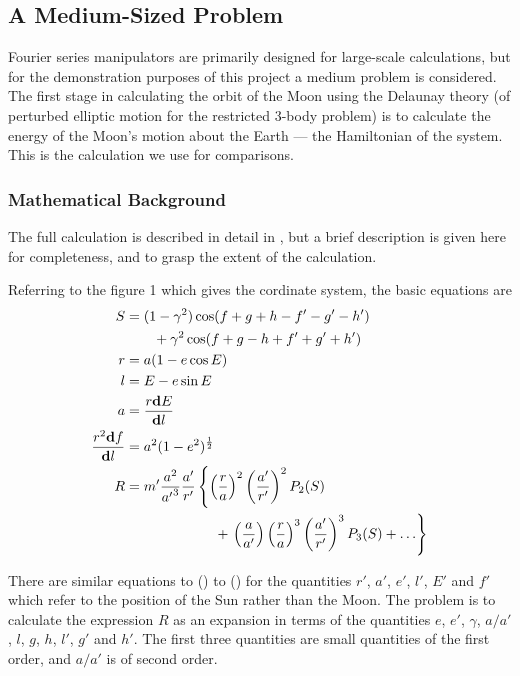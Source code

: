 \subsection{A Medium-Sized Problem}

Fourier series manipulators are primarily designed for large-scale
calculations, but for the demonstration purposes of this project a
medium problem is considered.  The first stage in calculating the
orbit of the Moon using the Delaunay theory (of perturbed elliptic
motion for the restricted 3-body problem) is to calculate the energy
of the Moon's motion about the Earth --- the Hamiltonian of the
system.   This is the calculation we use for comparisons.

\subsubsection{Mathematical Background}

The full calculation is described in detail in \cite{Brown:1896}, but a
brief description is given here for completeness, and to grasp the
extent of the calculation.

Referring to the figure 1 which gives the cordinate system, the basic
equations are
\begin{align}
  S  & = (1-\gamma ^2)\cos(f + g +h -f' -g' -h') \notag \\
     & \qquad + \gamma ^2 \cos(f + g -h +f' +g' +h')  \label{eq:calc-S}\\
r & = a (1 - e \cos E) \label{eq:radial}\\
l & = E - e \sin E \label{eq:Kepler}\\
a & = \frac{r\mathbf{d} E}{\mathbf{d}l} \label{eq:calc-a}\\
\frac{r ^2 \mathbf{d} f}{\mathbf{d} l} & = a^2 (1 - e^2)^{\frac{1}{2}} \label{eq:calc-f}\\
  R & = m' \frac{a^2}{{a'}^3} \frac{a'}{r'}
         \left \{ \left (\frac{r}{a}\right )^2
              \left (\frac{a'}{r'}\right )^2 P_2(S) \right. \notag \\
     & \hphantom{ = m' \frac{a^2}{{a'}^3} \frac{a'}{r'} \Biggl\{ \Biggr\} }
       + \left. \left (\frac{a}{a'}\right )\left
              (\frac{r}{a}\right )^3 \left (\frac{a'}{r'}\right )^3 P_3(S)
              + \ldots \right \} \label{eq:calc-R}
\end{align}

There are similar equations to () to () for the quantities $r'$,
$a'$, $e'$, $l'$, $E'$ and $f'$ which refer to the position of the Sun
rather than the Moon.  The problem is to calculate the expression $R$
as an expansion in terms of the quantities $e$, $e'$, $\gamma$,
$a/a'$, $l$, $g$, $h$, $l'$, $g'$ and $h'$.  The first three
quantities are small quantities of the first order, and $a/a'$ is of
second order.

